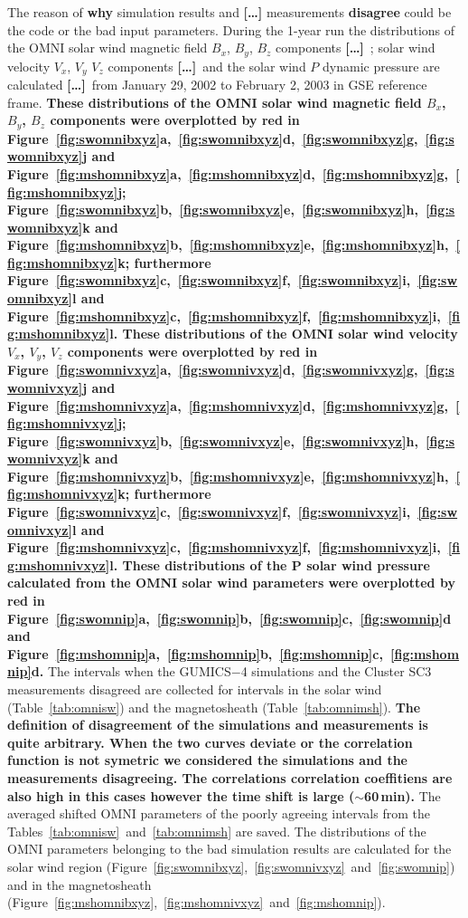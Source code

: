 \documentclass[linenumbers,draft]{agujournal}
\newcommand{\del}{\textbf{[\dots]}\ } %
\begin{document}
The reason of \textbf{why} simulation results and \textbf{[\dots]} measurements \textbf{disagree} could be the code or the bad input parameters. During the 1-year run the distributions of the OMNI solar wind magnetic field $B_{x}$, $B_{y}$, $B_{z}$ components \del; solar wind velocity $V_{x}$, $V_{y}$ $V_{z}$ components \del and the solar wind $P$ dynamic pressure are calculated \del from January 29, 2002 to February 2, 2003 in GSE reference frame. \textbf{These distributions of the OMNI solar wind magnetic field $B_{x}$, $B_{y}$, $B_{z}$ components were overplotted by red in Figure~\ref{fig:swomnibxyz}a,~\ref{fig:swomnibxyz}d,~\ref{fig:swomnibxyz}g,~\ref{fig:swomnibxyz}j and Figure~\ref{fig:mshomnibxyz}a,~\ref{fig:mshomnibxyz}d,~\ref{fig:mshomnibxyz}g,~\ref{fig:mshomnibxyz}j; Figure~\ref{fig:swomnibxyz}b,~\ref{fig:swomnibxyz}e,~\ref{fig:swomnibxyz}h,~\ref{fig:swomnibxyz}k and Figure~\ref{fig:mshomnibxyz}b,~\ref{fig:mshomnibxyz}e,~\ref{fig:mshomnibxyz}h,~\ref{fig:mshomnibxyz}k; furthermore Figure~\ref{fig:swomnibxyz}c,~\ref{fig:swomnibxyz}f,~\ref{fig:swomnibxyz}i,~\ref{fig:swomnibxyz}l and Figure~\ref{fig:mshomnibxyz}c,~\ref{fig:mshomnibxyz}f,~\ref{fig:mshomnibxyz}i,~\ref{fig:mshomnibxyz}l. These distributions of the OMNI solar wind velocity $V_{x}$, $V_{y}$, $V_{z}$ components were overplotted by red in Figure~\ref{fig:swomnivxyz}a,~\ref{fig:swomnivxyz}d,~\ref{fig:swomnivxyz}g,~\ref{fig:swomnivxyz}j and Figure~\ref{fig:mshomnivxyz}a,~\ref{fig:mshomnivxyz}d,~\ref{fig:mshomnivxyz}g,~\ref{fig:mshomnivxyz}j; Figure~\ref{fig:swomnivxyz}b,~\ref{fig:swomnivxyz}e,~\ref{fig:swomnivxyz}h,~\ref{fig:swomnivxyz}k and Figure~\ref{fig:mshomnivxyz}b,~\ref{fig:mshomnivxyz}e,~\ref{fig:mshomnivxyz}h,~\ref{fig:mshomnivxyz}k; furthermore Figure~\ref{fig:swomnivxyz}c,~\ref{fig:swomnivxyz}f,~\ref{fig:swomnivxyz}i,~\ref{fig:swomnivxyz}l and Figure~\ref{fig:mshomnivxyz}c,~\ref{fig:mshomnivxyz}f,~\ref{fig:mshomnivxyz}i,~\ref{fig:mshomnivxyz}l. These distributions of the P solar wind pressure calculated from the OMNI solar wind parameters were overplotted by red in Figure~\ref{fig:swomnip}a,~\ref{fig:swomnip}b,~\ref{fig:swomnip}c,~\ref{fig:swomnip}d and Figure~\ref{fig:mshomnip}a,~\ref{fig:mshomnip}b,~\ref{fig:mshomnip}c,~\ref{fig:mshomnip}d.} The intervals when the GUMICS$-$4 simulations and the Cluster SC3 measurements disagreed are collected for intervals in the solar wind (Table~\ref{tab:omnisw}) and the magnetosheath (Table~\ref{tab:omnimsh}). \textbf{The definition of disagreement of the simulations and measurements is quite arbitrary. When the two curves deviate or the correlation function is not symetric we considered the simulations and the measurements disagreeing. The correlations correlation coeffitiens are also high in this cases however the time shift is large ($\sim$60\,min).} The averaged shifted OMNI parameters of the poorly agreeing intervals from the Tables~\ref{tab:omnisw}~and~\ref{tab:omnimsh} are saved. The distributions of the OMNI parameters belonging to the bad simulation results are calculated for the solar wind region (Figure~\ref{fig:swomnibxyz},~\ref{fig:swomnivxyz}~and~\ref{fig:swomnip}) and in the magnetosheath (Figure~\ref{fig:mshomnibxyz},~\ref{fig:mshomnivxyz}~and~\ref{fig:mshomnip}).
\end{document}
